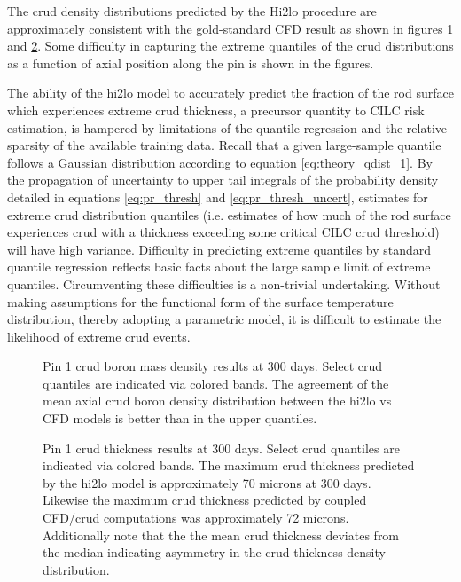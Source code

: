 The crud density distributions predicted by the Hi2lo procedure are approximately consistent with the gold-standard CFD result as shown in figures \ref{fig:dist_hi2loimppinzbmass} and \ref{fig:dist_hi2loimppinzcthick}. Some difficulty in capturing the extreme quantiles of the crud distributions as a function of axial position along the pin is shown in the figures. 

The ability of the hi2lo model to accurately predict the fraction of the rod surface which experiences extreme crud thickness, a precursor quantity to CILC risk estimation, is hampered by limitations of the quantile regression and the relative sparsity of the available training data.  Recall that a given large-sample quantile follows a Gaussian distribution according to equation \ref{eq:theory_qdist_1}. By the propagation of uncertainty to upper tail integrals of the probability density detailed in equations \ref{eq:pr_thresh} and \ref{eq:pr_thresh_uncert}, estimates for extreme crud distribution quantiles (i.e. estimates of how much of the rod surface experiences crud with a thickness exceeding some critical CILC crud threshold) will have high variance.  Difficulty in predicting extreme quantiles by standard quantile regression reflects basic facts about the large sample limit of extreme quantiles.
Circumventing these difficulties is a non-trivial undertaking.  Without making assumptions for the functional form of the surface temperature distribution, thereby adopting a parametric model, it is difficult to estimate the likelihood of extreme crud events.

\begin{figure}[H]%
    \centering
    \qquad
    \caption[Pin 1 crud boron mass density results at 300 days]{Pin 1 crud boron mass density results at 300 days.  Select crud quantiles are indicated via colored bands.  The agreement of the mean axial crud boron density distribution between the hi2lo vs CFD models is better than in the upper quantiles. }%
    \label{fig:dist_hi2loimppinzbmass}
\end{figure}


\begin{figure}[H]%
    \centering
    \qquad
    \caption[Pin 1 crud thickness results at 300 days]{Pin 1 crud thickness results at 300 days.  Select crud quantiles are indicated via colored bands.  The maximum crud thickness predicted by the hi2lo model is approximately 70 microns at 300 days.  Likewise the maximum crud thickness predicted by coupled CFD/crud computations was approximately 72 microns.  Additionally note that the the mean crud thickness deviates from the median indicating asymmetry in the crud thickness density distribution.}%
    \label{fig:dist_hi2loimppinzcthick}
\end{figure}


